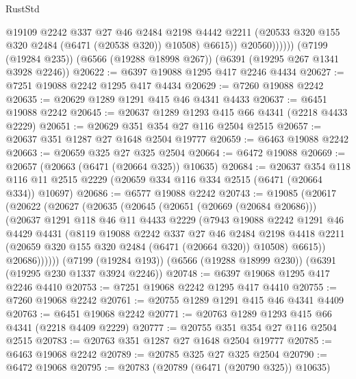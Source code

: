 \begin{lexlean}{RustStd}
\begin{coremodule}
{\begin{coremodule}
{{{{{{{{{{{{{{{{{{{{{{{{{{                    @19109
                    @2242
                    @337
                    @27
                    @46
                    @2484
                    @2198
                    @4442
                    @2211
                    (@20533 @320 @155 @320 @2484 (@6471 (@20538 @320)) @10508)
                    @6615))
                @20560))))))
    (@7199 (@19284 @235))
    (@6566 (@19288 @18998 @267))
    (@6391 (@19295 @267 @1341 @3928 @2246))
@20622 := @6397 @19088 @1295 @417 @2246 @4434
@20627 := @7251 @19088 @2242 @1295 @417 @4434
@20629 := @7260 @19088 @2242
@20635 := @20629 @1289 @1291 @415 @46 @4341 @4433
@20637 := @6451 @19088 @2242
@20645 := @20637 @1289 @1293 @415 @66 @4341 (@2218 @4433 @2229)
@20651 := @20629 @351 @354 @27 @116 @2504 @2515
@20657 := @20637 @351 @1287 @27 @1648 @2504 @19777
@20659 := @6463 @19088 @2242
@20663 := @20659 @325 @27 @325 @2504
@20664 := @6472 @19088
@20669 := @20657 (@20663 (@6471 (@20664 @325)) @10635)
@20684 := @20637
    @354
    @118
    @116
    @11
    @2515
    @2229
    (@20659 @334 @116 @334 @2515 (@6471 (@20664 @334)) @10697)
@20686 := @6577 @19088 @2242
@20743 := @19085
    (@20617
      (@20622
        (@20627
          (@20635
            (@20645
              (@20651 (@20669 (@20684 @20686)))
              (@20637
                @1291
                @118
                @46
                @11
                @4433
                @2229
                (@7943
                  @19088
                  @2242
                  @1291
                  @46
                  @4429
                  @4431
                  (@8119
                    @19088
                    @2242
                    @337
                    @27
                    @46
                    @2484
                    @2198
                    @4418
                    @2211
                    (@20659 @320 @155 @320 @2484 (@6471 (@20664 @320)) @10508)
                    @6615))
                @20686))))))
    (@7199 (@19284 @193))
    (@6566 (@19288 @18999 @230))
    (@6391 (@19295 @230 @1337 @3924 @2246))
@20748 := @6397 @19068 @1295 @417 @2246 @4410
@20753 := @7251 @19068 @2242 @1295 @417 @4410
@20755 := @7260 @19068 @2242
@20761 := @20755 @1289 @1291 @415 @46 @4341 @4409
@20763 := @6451 @19068 @2242
@20771 := @20763 @1289 @1293 @415 @66 @4341 (@2218 @4409 @2229)
@20777 := @20755 @351 @354 @27 @116 @2504 @2515
@20783 := @20763 @351 @1287 @27 @1648 @2504 @19777
@20785 := @6463 @19068 @2242
@20789 := @20785 @325 @27 @325 @2504
@20790 := @6472 @19068
@20795 := @20783 (@20789 (@6471 (@20790 @325)) @10635)
}}}}}}}}}}}}}}}}}}}}}}}}}}
\end{coremodule}}
\end{coremodule}
\end{lexlean}
